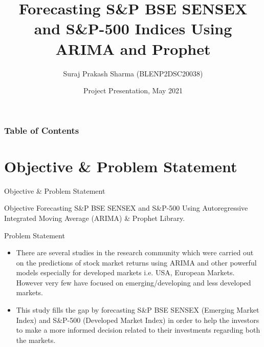 \documentclass{beamer}
\title[\textcolor{white}{Forecasting BSE SENSEX and S\&P-500}] %
{Forecasting S\&P BSE SENSEX and S\&P-500 Indices Using ARIMA and Prophet}
\author[Suraj Prakash Sharma] %
{Suraj Prakash Sharma \newline (BLENP2DSC20038)}
\institute[] %
{
  M.Tech Data Science (IInd Semester)\\
  Amrita Vishwa Vidyapeetham, School of Engineering, Bengaluru
}
\date[] %
{Project Presentation, May 2021}
\begin{document}
\frame{\titlepage}

\begin{frame}
	\frametitle{Table of Contents}
	\tableofcontents
\end{frame}
\section{Objective \& Problem Statement}
\begin{frame}{Objective \& Problem Statement}
	\begin{block}{Objective}
		Forecasting S\&P BSE SENSEX and S\&P-500 Using Autoregressive Integrated Moving Average (ARIMA) \& Prophet Library.
	\end{block}
	\pause
	\begin{block} {Problem Statement}
		\begin{itemize}
			\item There are several studies in the research community which were carried out on the predictions of stock market returns using ARIMA and other powerful models especially for developed markets i.e. USA, European Markets. However very few have focused on emerging/developing and less developed markets.
			\item This study fills the gap by forecasting S\&P BSE SENSEX (Emerging Market Index) and S\&P-500 (Developed Market Index) in order to help the investors to make a more informed decision related to their investments regarding both the markets.
		\end{itemize}
	\end{block}
\end{frame}

\end{document}
